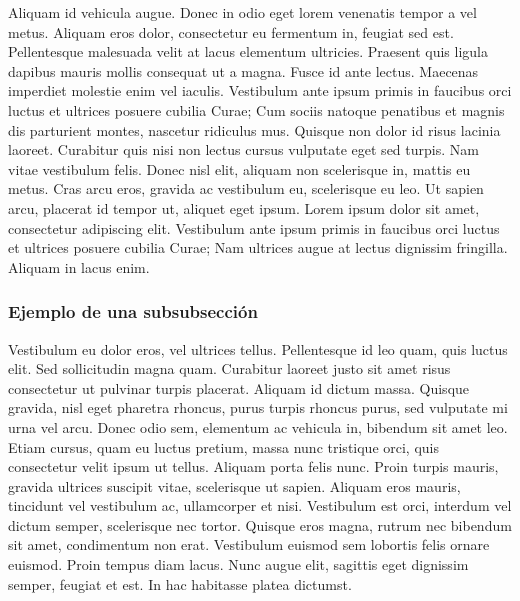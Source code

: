 \documentclass[11pt,a4paper]{report}
\begin{document}
Aliquam id vehicula augue. Donec in odio eget lorem venenatis tempor a vel metus. Aliquam eros dolor, consectetur eu fermentum in, feugiat sed est. Pellentesque malesuada velit at lacus elementum ultricies. Praesent quis ligula dapibus mauris mollis consequat ut a magna. Fusce id ante lectus. Maecenas imperdiet molestie enim vel iaculis. Vestibulum ante ipsum primis in faucibus orci luctus et ultrices posuere cubilia Curae; Cum sociis natoque penatibus et magnis dis parturient montes, nascetur ridiculus mus. Quisque non dolor id risus lacinia laoreet. Curabitur quis nisi non lectus cursus vulputate eget sed turpis. Nam vitae vestibulum felis. Donec nisl elit, aliquam non scelerisque in, mattis eu metus. Cras arcu eros, gravida ac vestibulum eu, scelerisque eu leo. Ut sapien arcu, placerat id tempor ut, aliquet eget ipsum. Lorem ipsum dolor sit amet, consectetur adipiscing elit. Vestibulum ante ipsum primis in faucibus orci luctus et ultrices posuere cubilia Curae; Nam ultrices augue at lectus dignissim fringilla. Aliquam in lacus enim.








\subsubsection{Ejemplo de una subsubsección}

Vestibulum eu dolor eros, vel ultrices tellus. Pellentesque id leo quam, quis luctus elit. Sed sollicitudin magna quam. Curabitur laoreet justo sit amet risus consectetur ut pulvinar turpis placerat. Aliquam id dictum massa. Quisque gravida, nisl eget pharetra rhoncus, purus turpis rhoncus purus, sed vulputate mi urna vel arcu. Donec odio sem, elementum ac vehicula in, bibendum sit amet leo. Etiam cursus, quam eu luctus pretium, massa nunc tristique orci, quis consectetur velit ipsum ut tellus. Aliquam porta felis nunc. Proin turpis mauris, gravida ultrices suscipit vitae, scelerisque ut sapien. Aliquam eros mauris, tincidunt vel vestibulum ac, ullamcorper et nisi. Vestibulum est orci, interdum vel dictum semper, scelerisque nec tortor. Quisque eros magna, rutrum nec bibendum sit amet, condimentum non erat. Vestibulum euismod sem lobortis felis ornare euismod. Proin tempus diam lacus. Nunc augue elit, sagittis eget dignissim semper, feugiat et est. In hac habitasse platea dictumst.
\end{document}
